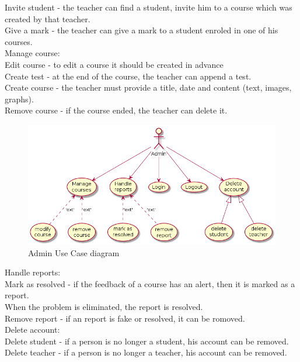 \documentclass[12pt,a4paper,titlepage]{article}
\newcommand\tab[1][1cm]{\hspace*{#1}}
\begin{document}
\noindent
Invite student - the teacher can find a student, invite him to a course which was created by that teacher.\\
Give a mark - the teacher can give a mark to a student enroled in one of his courses.\\
Manage course:\\
\tab Edit course - to edit a course it should be created in advance\\
\tab Create test - at the end of the course, the teacher can append a test.\\
\tab Create course - the teacher must provide a title, date and content (text, images, graphs).\\
\tab Remove course - if the course ended, the teacher can delete it.\\

\clearpage

\begin{figure}[H]
\includegraphics[width=\textwidth]{admin}
\caption{Admin Use Case diagram}
\centering
\end{figure}

\noindent
Handle reports:\\
\tab Mark as resolved - if the feedback of a course has an alert, then it is marked as a report.\\
\tab When the problem is eliminated, the report is resolved.\\
\tab Remove report - if an report is fake or resolved, it can be romoved.\\
Delete account:\\
\tab Delete student - if a person is no longer a student, his account can be removed.
\tab Delete teacher - if a person is no longer a teacher, his account can be removed.
\end{document}

